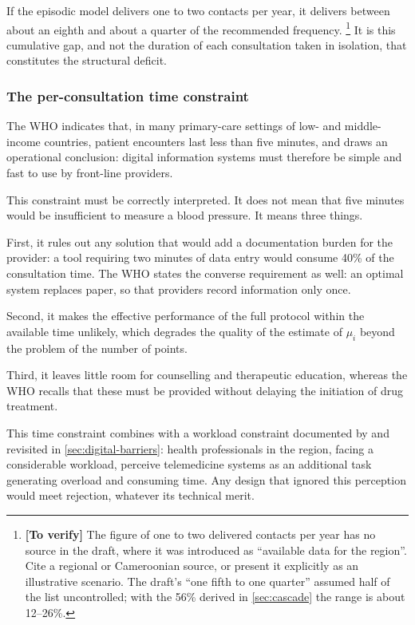 \documentclass[12pt,a4paper,oneside]{report}
\newcommand{\verify}[1]{\footnote{\textbf{[To verify]} #1}}
\begin{document}
If the episodic model delivers one to two contacts per year, it delivers between about an eighth and about a quarter of the recommended frequency.%
\verify{The figure of one to two delivered contacts per year has no source in the draft, where it was introduced as ``available data for the region''. Cite a regional or Cameroonian source, or present it explicitly as an illustrative scenario. The draft's ``one fifth to one quarter'' assumed half of the list uncontrolled; with the 56\% derived in \cref{sec:cascade} the range is about 12--26\%.}
It is this cumulative gap, and not the duration of each consultation taken in isolation, that constitutes the structural deficit.

\subsubsection{The per-consultation time constraint}\label{sec:time}

The WHO indicates that, in many primary-care settings of low- and middle-income countries, patient encounters last less than five minutes, and draws an operational conclusion: digital information systems must therefore be simple and fast to use by front-line providers.

This constraint must be correctly interpreted. It does not mean that five minutes would be insufficient to measure a blood pressure. It means three things.

First, it rules out any solution that would add a documentation burden for the provider: a tool requiring two minutes of data entry would consume 40\% of the consultation time. The WHO states the converse requirement as well: an optimal system replaces paper, so that providers record information only once.

Second, it makes the effective performance of the full protocol within the available time unlikely, which degrades the quality of the estimate of $\mu_i$ beyond the problem of the number of points.

Third, it leaves little room for counselling and therapeutic education, whereas the WHO recalls that these must be provided without delaying the initiation of drug treatment.

This time constraint combines with a workload constraint documented by \textcite{dodoo2022} and revisited in \cref{sec:digital-barriers}: health professionals in the region, facing a considerable workload, perceive telemedicine systems as an additional task generating overload and consuming time. Any design that ignored this perception would meet rejection, whatever its technical merit.
\end{document}
